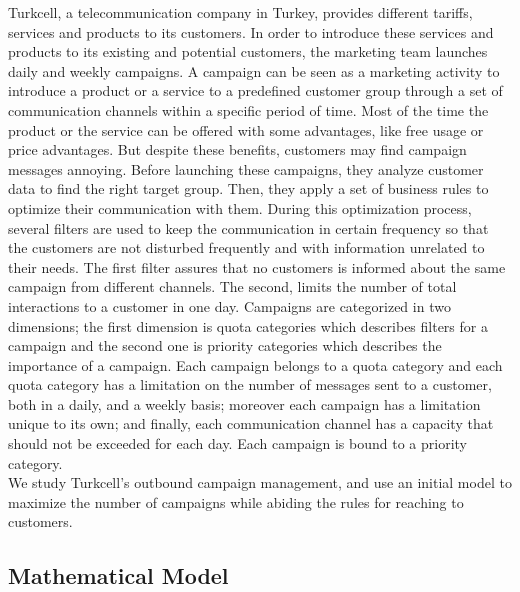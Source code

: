 \documentclass[11pt]{article}
\begin{document}
Turkcell, a telecommunication company in Turkey, provides different tariffs, services and products to its customers. In order to introduce these services and products to its existing and potential customers, the marketing team launches daily and weekly campaigns. A campaign can be seen as a marketing activity to introduce a product or a service to a predefined customer group through a set of communication channels within a specific period of time. Most of the time the product or the service can be offered with some advantages, like free usage or price advantages. But despite these benefits, customers may find campaign messages annoying. Before launching these campaigns, they analyze customer data to find the right target group. Then, they apply a set of business rules to optimize their communication with them. During this optimization process, several filters are used to keep the communication in certain frequency so that the customers are not disturbed frequently and with information unrelated to their needs. The first filter assures that no customers is informed about the same campaign from different channels. The second, limits the number of total interactions to a customer in one day. Campaigns are categorized in two dimensions; the first dimension is quota categories which describes filters for a campaign and the second one is priority categories which describes the importance of a campaign. Each campaign belongs to a quota category and each quota category has a limitation on the number of messages sent to a customer, both in a daily, and a weekly basis; moreover each campaign has a limitation unique to its own; and finally, each communication channel has a capacity that should not be exceeded for each day. Each campaign is bound to a priority category.\\

We study Turkcell’s outbound campaign management, and use an initial model to maximize the number of campaigns while abiding the rules for reaching to customers.

\subsection{Mathematical Model} \label{s:problem-math}
\end{document}
